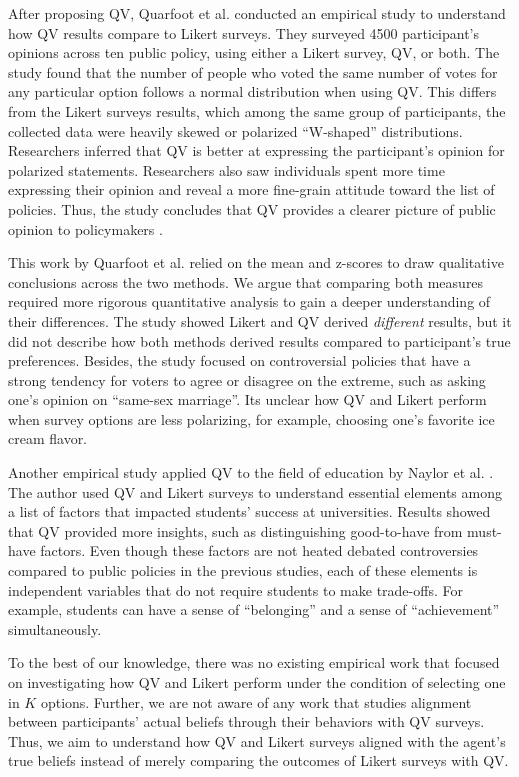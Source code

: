 After proposing QV, Quarfoot et al. \cite{quarfoot2017quadratic} conducted an empirical study to understand how QV results compare to Likert surveys. They surveyed 4500 participant's opinions across ten public policy, using either a Likert survey, QV, or both. The study found that the number of people who voted the same number of votes for any particular option follows a normal distribution when using QV. This  differs from the Likert surveys results, which among the same group of participants, the collected data were heavily skewed or polarized ``W-shaped'' distributions. Researchers inferred that QV is better at expressing the participant's opinion for polarized statements. Researchers also saw individuals spent more time expressing their opinion and reveal a more fine-grain attitude toward the list of policies. Thus, the study concludes that QV provides a clearer picture of public opinion to policymakers \cite{quarfoot2017quadratic}. %

This work by Quarfoot et al. relied on the mean and z-scores to draw qualitative conclusions across the two methods. We argue that comparing both measures required more rigorous quantitative analysis to gain a deeper understanding of their differences. The study showed Likert and QV derived \textit{different} results, but it did not describe how both methods derived results compared to participant's true preferences. Besides, the study focused on controversial policies that have a strong tendency for voters to agree or disagree on the extreme, such as asking one's opinion on ``same-sex marriage''. Its unclear how QV and Likert perform when survey options are less polarizing, for example, choosing one's favorite ice cream flavor.\par

Another empirical study applied QV to the field of education by Naylor et al. \cite{naylor2017first}. The author used QV and Likert surveys to understand essential elements among a list of factors that impacted students' success at universities. Results showed that QV provided more insights, such as distinguishing good-to-have from must-have factors. Even though these factors are not heated debated controversies compared to public policies in the previous studies, each of these elements is independent variables that do not require students to make trade-offs. For example, students can have a sense of ``belonging'' and a sense of ``achievement'' simultaneously.

To the best of our knowledge, there was no existing empirical work that focused on investigating how QV and Likert perform under the condition of selecting one in $K$ options. Further, we are not aware of any work that studies alignment between participants' actual beliefs through their behaviors with QV surveys. Thus, we aim to understand how QV and Likert surveys aligned with the agent's true beliefs instead of merely comparing the outcomes of Likert surveys with QV. 

